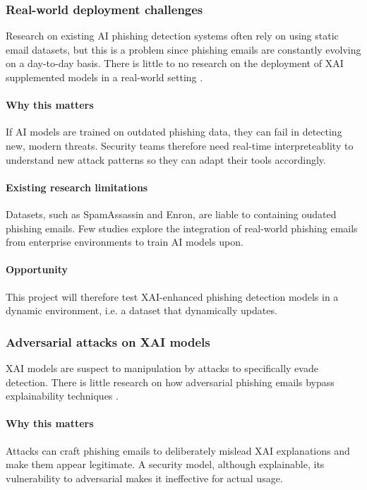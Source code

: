\subsubsection*{Real-world deployment challenges}
Research on existing AI phishing detection systems often rely on using static email datasets, but this is a problem since phishing emails are constantly evolving on a day-to-day basis. There is little to no research on the deployment of XAI supplemented models in a real-world setting \citep{verma2022classification}.

\paragraph{Why this matters}
If AI models are trained on outdated phishing data, they can fail in detecting new, modern threats. Security teams therefore need real-time interpreteablity to understand new attack patterns so they can adapt their tools accordingly.

\paragraph{Existing research limitations}
Datasets, such as SpamAssassin and Enron, are liable to containing oudated phishing emails. Few studies explore the integration of real-world phishing emails from enterprise environments to train AI models upon.

\paragraph{Opportunity}
This project will therefore test XAI-enhanced phishing detection models in a dynamic environment, i.e. a dataset that dynamically updates.

\subsubsection*{Adversarial attacks on XAI models}
XAI models are suspect to manipulation by attacks to specifically evade detection. There is little research on how adversarial phishing emails bypass explainability techniques \citep{carlini2017adversarial}.

\paragraph{Why this matters}
Attacks can craft phishing emails to deliberately mislead XAI explanations and make them appear legitimate. A security model, although explainable, its vulnerability to adversarial makes it ineffective for actual usage.

